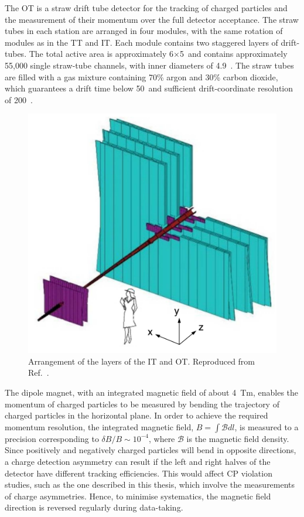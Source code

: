 The OT is a straw drift tube detector for the tracking of charged particles and the measurement of their momentum over the full detector acceptance. The straw tubes in each station are arranged in four modules, with the same rotation of modules as in the TT and IT. Each module contains two staggered layers of drift-tubes. The total active area is approximately 6$\times$5~\mma and contains approximately 55,000 single straw-tube channels, with inner diameters of 4.9~\mm. The straw tubes are filled with a gas mixture containing 70\% argon and 30\% carbon dioxide, which guarantees a drift time below 50~\ns and sufficient drift-coordinate resolution of 200~\mum.

\begin{figure}
\centering
\includegraphics[width=0.5\linewidth]{figures/detector/InnerAndOuterTracker.pdf}
\caption{Arrangement of the layers of the IT and OT. Reproduced from Ref.~\cite{lhcbdetector2008}.}
\label{itandot}
\end{figure}

The dipole magnet, with an integrated magnetic field of about 4~Tm, enables the momentum of charged particles to be measured by bending the trajectory of charged particles in the horizontal plane. In order to achieve the required momentum resolution, the integrated magnetic field, $B = \int{\mathcal{B} dl}$, is measured to a precision corresponding to $\delta B /B \sim 10^{-4}$, where $\mathcal{B}$ is the magnetic field density. Since positively and negatively charged particles will bend in opposite directions, a charge detection asymmetry can result if the left and right halves of the detector have different tracking efficiencies. This would affect CP violation studies, such as the one described in this thesis, which involve the measurements of charge asymmetries. Hence, to minimise systematics, the magnetic field direction is reversed regularly during data-taking.

